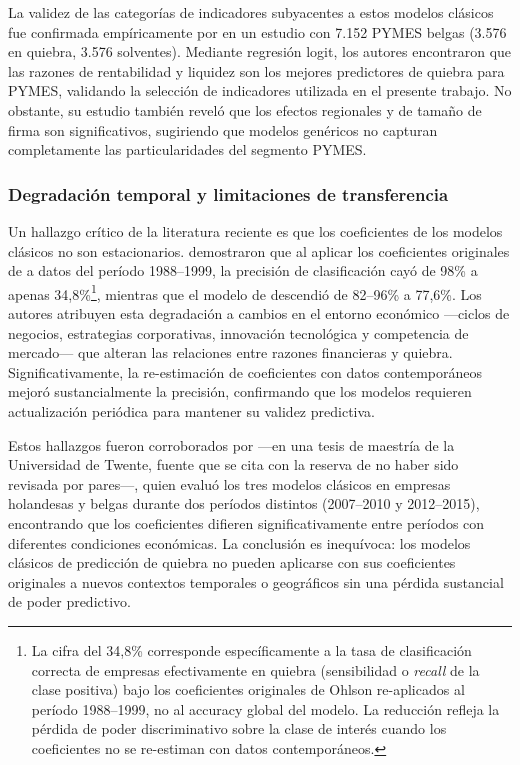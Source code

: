 \documentclass[12pt, letterpaper]{article}
\begin{document}
La validez de las categor\'ias de indicadores subyacentes a estos modelos cl\'asicos fue confirmada emp\'iricamente por \citet{Cultrera2016} en un estudio con 7.152 PYMES belgas (3.576 en quiebra, 3.576 solventes). Mediante regresi\'on logit, los autores encontraron que las razones de rentabilidad y liquidez son los mejores predictores de quiebra para PYMES, validando la selecci\'on de indicadores utilizada en el presente trabajo. No obstante, su estudio tambi\'en revel\'o que los efectos regionales y de tama\~no de firma son significativos, sugiriendo que modelos gen\'ericos no capturan completamente las particularidades del segmento PYMES.

\subsubsection{Degradaci\'on temporal y limitaciones de transferencia}

Un hallazgo cr\'itico de la literatura reciente es que los coeficientes de los modelos cl\'asicos no son estacionarios. \citet{Grice2003} demostraron que al aplicar los coeficientes originales de \citet{Ohlson1980} a datos del per\'iodo 1988--1999, la precisi\'on de clasificaci\'on cay\'o de 98\% a apenas 34,8\%\footnote{La cifra del 34,8\% corresponde espec\'ificamente a la tasa de clasificaci\'on correcta de empresas efectivamente en quiebra (sensibilidad o \textit{recall} de la clase positiva) bajo los coeficientes originales de Ohlson re-aplicados al per\'iodo 1988--1999, no al accuracy global del modelo. La reducci\'on refleja la p\'erdida de poder discriminativo sobre la clase de inter\'es cuando los coeficientes no se re-estiman con datos contempor\'aneos.}, mientras que el modelo de \citet{Zmijewski1984} descendi\'o de 82--96\% a 77,6\%. Los autores atribuyen esta degradaci\'on a cambios en el entorno econ\'omico ---ciclos de negocios, estrategias corporativas, innovaci\'on tecnol\'ogica y competencia de mercado--- que alteran las relaciones entre razones financieras y quiebra. Significativamente, la re-estimaci\'on de coeficientes con datos contempor\'aneos mejor\'o sustancialmente la precisi\'on, confirmando que los modelos requieren actualizaci\'on peri\'odica para mantener su validez predictiva.

Estos hallazgos fueron corroborados por \citet{Bouwmeester2020} ---en una tesis de maestr\'ia de la Universidad de Twente, fuente que se cita con la reserva de no haber sido revisada por pares---, quien evalu\'o los tres modelos cl\'asicos en empresas holandesas y belgas durante dos per\'iodos distintos (2007--2010 y 2012--2015), encontrando que los coeficientes difieren significativamente entre per\'iodos con diferentes condiciones econ\'omicas. La conclusi\'on es inequ\'ivoca: los modelos cl\'asicos de predicci\'on de quiebra no pueden aplicarse con sus coeficientes originales a nuevos contextos temporales o geogr\'aficos sin una p\'erdida sustancial de poder predictivo.
\end{document}
